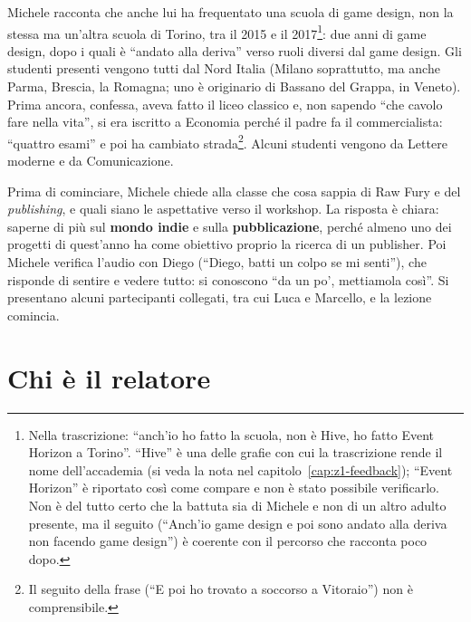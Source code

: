 Michele racconta che anche lui ha frequentato una scuola di game design, non
la stessa ma un'altra scuola di Torino, tra il 2015 e il
2017\footnote{Nella trascrizione: ``anch'io ho fatto la scuola, non è Hive, ho
fatto Event Horizon a Torino''. ``Hive'' è una delle grafie con cui la
trascrizione rende il nome dell'accademia (si veda la nota nel
capitolo~\ref{cap:z1-feedback}); ``Event Horizon'' è riportato così come
compare e non è stato possibile verificarlo. Non è del tutto certo che la
battuta sia di Michele e non di un altro adulto presente, ma il seguito
(``Anch'io game design e poi sono andato alla deriva non facendo game design'')
è coerente con il percorso che racconta poco dopo.}: due anni di game design,
dopo i quali è ``andato alla deriva'' verso ruoli diversi dal game design. Gli
studenti presenti vengono tutti dal Nord Italia (Milano soprattutto, ma anche
Parma, Brescia, la Romagna; uno è originario di Bassano del Grappa, in Veneto).
Prima ancora, confessa, aveva fatto il liceo classico e, non sapendo ``che
cavolo fare nella vita'', si era iscritto a Economia perché il padre fa il
commercialista: ``quattro esami'' e poi ha cambiato strada\footnote{Il seguito
della frase (``E poi ho trovato a soccorso a Vitoraio'') non è
comprensibile.}. Alcuni studenti vengono da Lettere moderne e da
Comunicazione.

Prima di cominciare, Michele chiede alla classe che cosa sappia di Raw Fury e
del \emph{publishing}, e quali siano le aspettative verso il workshop. La
risposta è chiara: saperne di più sul \textbf{mondo indie} e sulla
\textbf{pubblicazione}, perché almeno uno dei progetti di quest'anno ha come
obiettivo proprio la ricerca di un publisher. Poi Michele verifica l'audio con
Diego (``Diego, batti un colpo se mi senti''), che risponde di sentire e
vedere tutto: si conoscono ``da un po', mettiamola così''. Si presentano alcuni
partecipanti collegati, tra cui Luca e Marcello, e la lezione comincia.

\section{Chi è il relatore}
\label{sec:z4-relatore}

